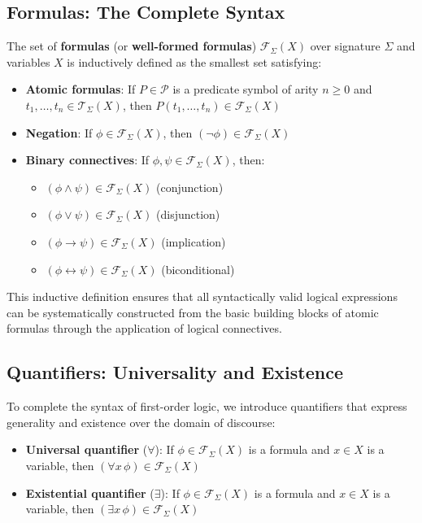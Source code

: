 \documentclass[11pt,a4paper]{article}
\theoremstyle{definition}
\theoremstyle{plain}
\theoremstyle{remark}
\begin{document}
\subsection{Formulas: The Complete Syntax}

The set of \textbf{formulas} (or \textbf{well-formed formulas}) $\mathcal{F}_\Sigma(X)$ over signature $\Sigma$ and variables $X$ is inductively defined as the smallest set satisfying:

\begin{itemize}
    \item \textbf{Atomic formulas}: If $P \in \mathcal{P}$ is a predicate symbol of arity $n \geq 0$ and $t_1, \dots, t_n \in \mathcal{T}_\Sigma(X)$, then $P(t_1, \dots, t_n) \in \mathcal{F}_\Sigma(X)$

    \item \textbf{Negation}: If $\phi \in \mathcal{F}_\Sigma(X)$, then $(\neg \phi) \in \mathcal{F}_\Sigma(X)$

    \item \textbf{Binary connectives}: If $\phi, \psi \in \mathcal{F}_\Sigma(X)$, then:
        \begin{itemize}
            \item $(\phi \wedge \psi) \in \mathcal{F}_\Sigma(X)$ (conjunction)
            \item $(\phi \vee \psi) \in \mathcal{F}_\Sigma(X)$ (disjunction)
            \item $(\phi \rightarrow \psi) \in \mathcal{F}_\Sigma(X)$ (implication)
            \item $(\phi \leftrightarrow \psi) \in \mathcal{F}_\Sigma(X)$ (biconditional)
        \end{itemize}
\end{itemize}


This inductive definition ensures that all syntactically valid logical expressions can be systematically constructed from the basic building blocks of atomic formulas through the application of logical connectives.

\subsection{Quantifiers: Universality and Existence}

To complete the syntax of first-order logic, we introduce quantifiers that express generality and existence over the domain of discourse:

\begin{itemize}
    \item \textbf{Universal quantifier} ($\forall$): If $\phi \in \mathcal{F}_\Sigma(X)$ is a formula and $x \in X$ is a variable, then $(\forall x \, \phi) \in \mathcal{F}_\Sigma(X)$
    \item \textbf{Existential quantifier} ($\exists$): If $\phi \in \mathcal{F}_\Sigma(X)$ is a formula and $x \in X$ is a variable, then $(\exists x \, \phi) \in \mathcal{F}_\Sigma(X)$
\end{itemize}
\end{document}
